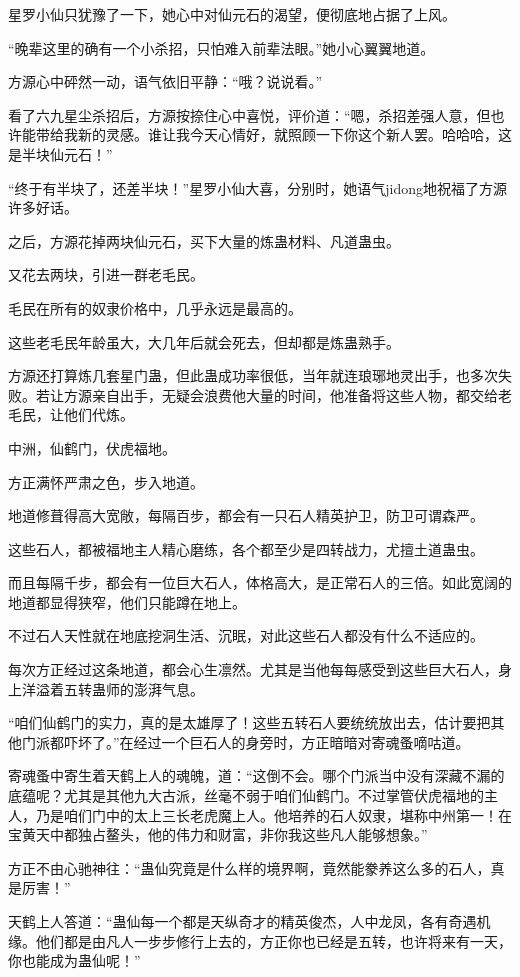 \begin{this_body}
星罗小仙只犹豫了一下，她心中对仙元石的渴望，便彻底地占据了上风。

“晚辈这里的确有一个小杀招，只怕难入前辈法眼。”她小心翼翼地道。

方源心中砰然一动，语气依旧平静：“哦？说说看。”

看了六九星尘杀招后，方源按捺住心中喜悦，评价道：“嗯，杀招差强人意，但也许能带给我新的灵感。谁让我今天心情好，就照顾一下你这个新人罢。哈哈哈，这是半块仙元石！”

“终于有半块了，还差半块！”星罗小仙大喜，分别时，她语气jidong地祝福了方源许多好话。

之后，方源花掉两块仙元石，买下大量的炼蛊材料、凡道蛊虫。

又花去两块，引进一群老毛民。

毛民在所有的奴隶价格中，几乎永远是最高的。

这些老毛民年龄虽大，大几年后就会死去，但却都是炼蛊熟手。

方源还打算炼几套星门蛊，但此蛊成功率很低，当年就连琅琊地灵出手，也多次失败。若让方源亲自出手，无疑会浪费他大量的时间，他准备将这些人物，都交给老毛民，让他们代炼。

中洲，仙鹤门，伏虎福地。

方正满怀严肃之色，步入地道。

地道修葺得高大宽敞，每隔百步，都会有一只石人精英护卫，防卫可谓森严。

这些石人，都被福地主人精心磨练，各个都至少是四转战力，尤擅土道蛊虫。

而且每隔千步，都会有一位巨大石人，体格高大，是正常石人的三倍。如此宽阔的地道都显得狭窄，他们只能蹲在地上。

不过石人天性就在地底挖洞生活、沉眠，对此这些石人都没有什么不适应的。

每次方正经过这条地道，都会心生凛然。尤其是当他每每感受到这些巨大石人，身上洋溢着五转蛊师的澎湃气息。

“咱们仙鹤门的实力，真的是太雄厚了！这些五转石人要统统放出去，估计要把其他门派都吓坏了。”在经过一个巨石人的身旁时，方正暗暗对寄魂蚤嘀咕道。

寄魂蚤中寄生着天鹤上人的魂魄，道：“这倒不会。哪个门派当中没有深藏不漏的底蕴呢？尤其是其他九大古派，丝毫不弱于咱们仙鹤门。不过掌管伏虎福地的主人，乃是咱们门中的太上三长老虎魔上人。他培养的石人奴隶，堪称中州第一！在宝黄天中都独占鳌头，他的伟力和财富，非你我这些凡人能够想象。”

方正不由心驰神往：“蛊仙究竟是什么样的境界啊，竟然能豢养这么多的石人，真是厉害！”

天鹤上人答道：“蛊仙每一个都是天纵奇才的精英俊杰，人中龙凤，各有奇遇机缘。他们都是由凡人一步步修行上去的，方正你也已经是五转，也许将来有一天，你也能成为蛊仙呢！”


\end{this_body}
